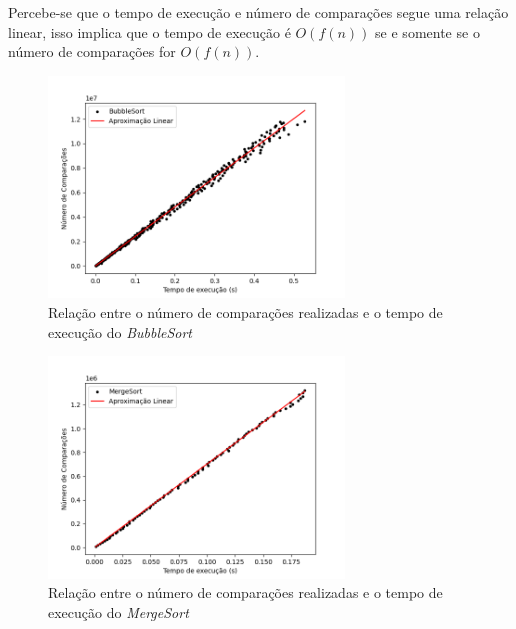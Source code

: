 \documentclass[12pt,a4paper,oneside]{article}
\begin{document}
\quad Percebe-se que o tempo de execução e número de comparações segue uma relação linear, isso implica que o tempo de execução é $O(f(n))$ se e somente se o número de comparações for $O(f(n))$. 

\begin{figure}[H]
\begin{center}
    \includegraphics[width=0.7\textwidth]{FigTNB.png} 
\end{center}
\caption{Relação entre o número de comparações realizadas e o tempo de execução do \textit{BubbleSort}}
\label{fig:ntb}
\end{figure}

\begin{figure}[H]
\begin{center}
    \includegraphics[width=0.7\textwidth]{FigTNM.png} 
\end{center}
\caption{Relação entre o número de comparações realizadas e o tempo de execução do \textit{MergeSort}}
\label{fig:ntm}
\end{figure}
\end{document}
